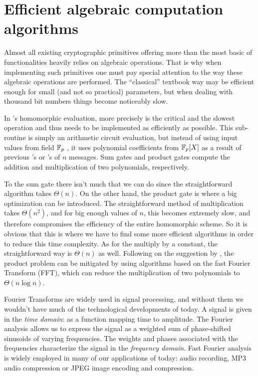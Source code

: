\chapter{Efficient algebraic computation algorithms}\label{chap:algebraic}

Almost all existing cryptographic primitives offering more than the most basic
of functionalities heavily relies on algebraic operations.
That is why when implementing such primitives one must pay special attention to
the way these algebraic operations are performed. The ``classical'' textbook
way may be efficient enough for small (and not so practical) parameters, but
when dealing with thousand bit numbers things become noticeably slow.

In 's homomorphic evaluation, more precisely
\GateEval is the critical and the slowest operation and thus needs to be
implemented as efficiently as possible. This sub-routine is simply an
arithmetic circuit evaluation, but instead of using input values from field
$\mathbb{F}_p$ , it uses polynomial coefficients from $\mathbb{F}_p[X]$ as a result of
previous \Auth's or \Eval's of $n$ messages. Sum gates and product gates
compute the addition and multiplication of two polynomials, respectively.

To the sum gate there isn't much that we can do since the straightforward
algorithm takes $\Theta(n)$. On the other hand, the product gate is where a big
optimization can be introduced. The straightforward method of multiplication
takes $\Theta(n^2)$, and for big enough values of $n$, this becomes extremely
slow, and therefore compromises the efficiency of the entire homomorphic
scheme. So it is obvious that this is where we have to find some more efficient
algorithms in order to reduce this time complexity. As for the multiply by
a constant, the straightforward way is $\Theta(n)$ as well.
Following on the suggestion by \citeauthor{catalano:fiore:2013}, the product
problem can be mitigated by using algorithms based on the fast Fourier
Transform (FFT), which can reduce the multiplication of two polynomials to
$\Theta(n \log n)$.

Fourier Transforms are widely used in signal processing, and without them we
wouldn't have much of the technological developments of today. A signal is
given in the \emph{time domain}: as a function mapping time to amplitude. The
Fourier analysis allows us to express the signal as a weighted sum of
phase-shifted sinusoids of varying frequencies. The weights and phases
associated with the frequencies characterize the signal in the \emph{frequency
domain}. Fast Fourier analysis is widely employed in many of our applications
of today: audio recording, MP3 audio compression or JPEG image encoding and
compression.

